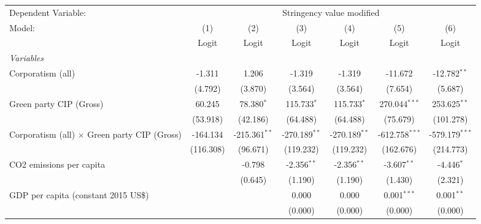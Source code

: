 
\begingroup
\centering
\begin{tabular}{lcccccc}
   \toprule
   Dependent Variable: & \multicolumn{6}{c}{Stringency value modified}\\
   Model:                                              & (1)       & (2)             & (3)             & (4)             & (5)              & (6)\\  
                                                       &  Logit    & Logit           & Logit           & Logit           & Logit            & Logit\\  
   \midrule
   \emph{Variables}\\
   Corporatism (all)                                   & -1.311    & 1.206           & -1.319          & -1.319          & -11.672          & -12.782$^{**}$\\   
                                                       & (4.792)   & (3.870)         & (3.564)         & (3.564)         & (7.654)          & (5.687)\\   
   Green party CIP (Gross)                             & 60.245    & 78.380$^{*}$    & 115.733$^{*}$   & 115.733$^{*}$   & 270.044$^{***}$  & 253.625$^{**}$\\   
                                                       & (53.918)  & (42.186)        & (64.488)        & (64.488)        & (75.679)         & (101.278)\\   
   Corporatism (all) $\times$ Green party CIP (Gross)  & -164.134  & -215.361$^{**}$ & -270.189$^{**}$ & -270.189$^{**}$ & -612.758$^{***}$ & -579.179$^{***}$\\   
                                                       & (116.308) & (96.671)        & (119.232)       & (119.232)       & (162.676)        & (214.773)\\   
   CO2 emissions per capita                            &           & -0.798          & -2.356$^{**}$   & -2.356$^{**}$   & -3.607$^{**}$    & -4.446$^{*}$\\   
                                                       &           & (0.645)         & (1.190)         & (1.190)         & (1.430)          & (2.321)\\   
   GDP per capita (constant 2015 US\$)                 &           &                 & 0.000           & 0.000           & 0.001$^{***}$    & 0.001$^{**}$\\   
                                                       &           &                 & (0.000)         & (0.000)         & (0.000)          & (0.000)\\   

\end{tabular}
